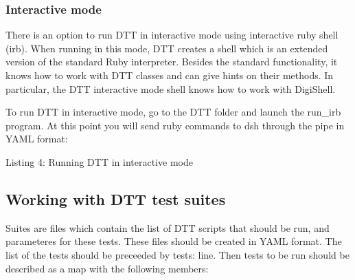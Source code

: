 \hypertarget{a00836_dtt_guide_04_interactive_mode}{}\subsubsection{Interactive mode}\label{a00836_dtt_guide_04_interactive_mode}
 There is an option to run D\+TT in interactive mode using interactive ruby shell (irb). When running in this mode, D\+TT creates a shell which is an extended version of the standard Ruby interpreter. Besides the standard functionality, it knows how to work with D\+TT classes and can give hints on their methods. In particular, the D\+TT interactive mode shell knows how to work with Digi\+Shell.

To run D\+TT in interactive mode, go to the D\+TT folder and launch the {\ttfamily run\+\_\+irb} program. At this point you will send ruby commands to dsh through the pipe in Y\+A\+ML format\+:


\begin{DoxyCode}{0}
\DoxyCodeLine{\textcolor{preprocessor}{\#... whatever you want to do}}
\end{DoxyCode}
 Listing 4\+: Running D\+TT in interactive mode



 \hypertarget{a00836_dtt_guide_02_working_with_dtt_test_suites}{}\subsection{Working with D\+T\+T test suites}\label{a00836_dtt_guide_02_working_with_dtt_test_suites}
 Suites are files which contain the list of D\+TT scripts that should be run, and parameteres for these tests. These files should be created in Y\+A\+ML format. The list of the tests should be preceeded by {\ttfamily tests\+:} line. Then tests to be run should be described as a map with the following members\+:


